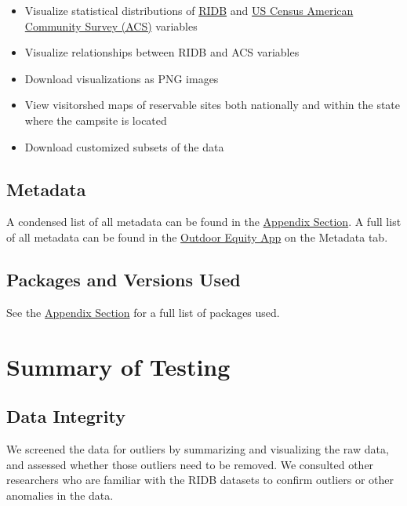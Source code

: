 \documentclass[
  11 pt,
  openany]{book}
\providecommand{\tightlist}{%
  \setlength{\itemsep}{0pt}\setlength{\parskip}{0pt}}
\begin{document}
\begin{itemize}
\tightlist
\item
  Visualize statistical distributions of \href{https://ridb.recreation.gov/download}{RIDB} and \href{https://www.census.gov/programs-surveys/acs/data.html}{US Census American Community Survey (ACS)} variables
\item
  Visualize relationships between RIDB and ACS variables
\item
  Download visualizations as PNG images
\item
  View visitorshed maps of reservable sites both nationally and within the state where the campsite is located
\item
  Download customized subsets of the data
\end{itemize}

\hypertarget{metadata}{%
\section{Metadata}\label{metadata}}

A condensed list of all metadata can be found in the \protect\hyperlink{metadata-table}{Appendix Section}. A full list of all metadata can be found in the \href{https://shinyapps.bren.ucsb.edu/oe_app/}{Outdoor Equity App} on the Metadata tab.

\hypertarget{packages-and-versions-used}{%
\section{Packages and Versions Used}\label{packages-and-versions-used}}

See the \protect\hyperlink{packages-table}{Appendix Section} for a full list of packages used.

\hypertarget{summary-of-testing}{%
\chapter{Summary of Testing}\label{summary-of-testing}}

\hypertarget{data-integrity}{%
\section{Data Integrity}\label{data-integrity}}

We screened the data for outliers by summarizing and visualizing the raw data, and assessed whether those outliers need to be removed. We consulted other researchers who are familiar with the RIDB datasets to confirm outliers or other anomalies in the data.
\end{document}
